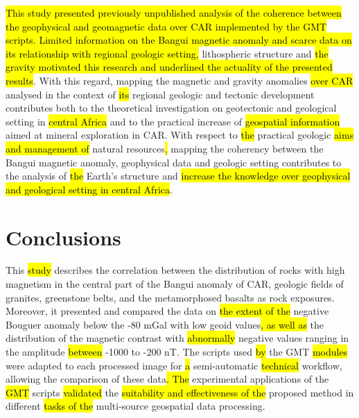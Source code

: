 \documentclass[minerals,article,submit,pdftex,moreauthors]{Definitions/mdpi}
\begin{document}
\hl{This study presented previously unpublished analysis of the coherence between the geophysical and geomagnetic data over CAR implemented by the GMT scripts. Limited information on the Bangui magnetic anomaly and scarce data on its relationship with regional geologic setting, }lithospheric structure and \hl{the gravity motivated this research and underlined the actuality of the presented results}. With this regard, mapping the magnetic and gravity anomalies \hl{over CAR }analysed in the context of \hl{its} regional geologic and tectonic development\hl{ }contributes both to the theoretical investigation on geotectonic and geological setting in \hl{central Africa} and to the practical increase of \hl{geospatial information} aimed at mineral exploration in CAR. With respect to \hl{the }practical geologic \hl{aims and management of }natural resources\hl{, }mapping the coherency between the Bangui magnetic anomaly, geophysical data and geologic setting\hl{ }contributes to the analysis of \hl{the }Earth's structure and\hl{ increase the knowledge over geophysical and geological setting in central Africa}.

\section{Conclusions}

This \hl{study} describes the correlation between the distribution of rocks with high magnetism in the central part of the Bangui anomaly of CAR, geologic fields of granites, greenstone belts, and the metamorphosed basalts as rock exposures. Moreover, it presented and compared the data on \hl{the extent of the }negative Bouguer anomaly below the -80 mGal with low geoid values\hl{, as well as }the distribution of the magnetic contrast with \hl{abnormally} negative values ranging in the amplitude \hl{between} -1000 to -200 nT. The scripts used \hl{by} the GMT \hl{modules }were adapted to each processed image for \hl{a }semi-automatic \hl{technical }workflow, allowing the comparison of these data\hl{. The }experimental applications of the \hl{GMT} scripts \hl{validated} the \hl{suitability and effectiveness of the }proposed method in different \hl{tasks of the }multi-source geospatial data processing.  
\end{document}
